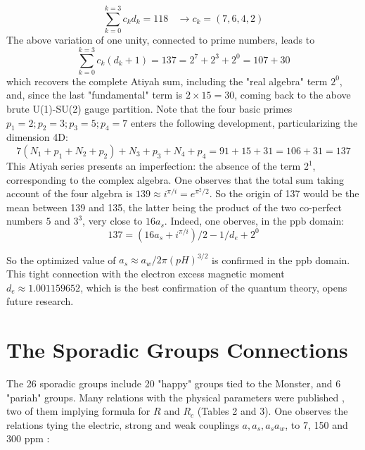 \documentclass[a4paper,9pt]{article}
\newcounter{row}
\begin{document}
\begin{equation}
 \sum_{k=0}^{k=3} c_k d_k = 118 ~~~~ \rightarrow   c_k = (7,6,4,2)
 \end{equation}
The above variation of one unity, connected to prime numbers, leads to
\begin{equation}
 \sum_{k=0}^{k=3} c_k (d_k + 1) = 137 = 2^7 + 2^3 + 2^0 = 107 + 30
 \end{equation}
which recovers the complete Atiyah sum, including the "real algebra" term $2^0$, and, since the last "fundamental" term is $2\times 15 = 30$, coming back to the above brute U(1)-SU(2) gauge partition. Note that the four basic primes $p_1 = 2; p_2 = 3; p_3 = 5; p_4 = 7$ enters the following development, particularizing the dimension 4D:
\begin{equation}
 7(N_1 + p_1 + N_2 + p_2) + N_3 + p_3 + N_4 + p_4  = 91 + 15 + 31 = 106 + 31 = 137
 \end{equation}
This Atiyah series presents an imperfection: the absence of the term $2^1$, corresponding to the complex algebra. One observes that the total sum taking account of the four algebra is $139 \approx i^{\pi/i} = e^{\pi^2/2}$. So the origin of 137 would be the mean between 139 and 135, the latter being the product of the two co-perfect numbers $5$ and $3^3$, very close to $16a_s$. Indeed, one oberves, in the ppb domain:
 \begin{equation}
 137 = (16a_s + i^{\pi/i})/2 - 1/d_e + 2^0
 \end{equation}

So the optimized value of $a_s\approx a_w/2\pi (pH)^{3/2}$ is confirmed in the ppb domain. This tight connection with the electron excess magnetic moment $d_e \approx 1.001159652$, which is the best confirmation of the quantum theory, opens future research.


\section{The Sporadic Groups Connections} 

The 26 sporadic groups include 20 "happy" groups tied to the Monster, and 6 "pariah" groups. Many relations with the physical parameters were published \cite{Sanchez3}, two of them implying formula for $R$ and $R_c$ (Tables 2 and 3). One observes the relations tying the electric, strong and weak couplings $a, a_s,a_s a_w$, to 7, 150 and 300 ppm  : 
\end{document}
